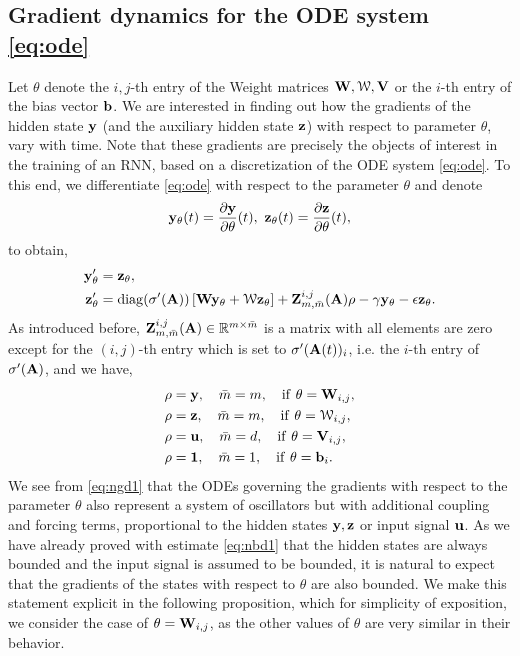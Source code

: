 \documentclass{article} \usepackage{iclr2021_conference,times}
\DeclareMathOperator{\diag}{diag}
\newcommand{\cW}{\EuScript{W}}
\newcommand{\by}{{\bf y}}
\newcommand{\bz}{{\bf z}}
\newcommand{\bW}{{\bf W}}
\newcommand{\bu}{{\bf u}}
\newcommand{\bb}{{\bf b}}
\newcommand{\bV}{{\bf V}}
\newcommand{\bA}{{\bf A}}
\begin{document}
\subsection{Gradient dynamics for the ODE system \eqref{eq:ode}}
\label{sec:gd}
Let $\theta$ denote the $i,j$-th entry of the Weight matrices $\bW,\cW,\bV$ or the $i$-th entry of the bias vector $\bb$. We are interested in finding out how the gradients of the hidden state $\by$ (and the auxiliary hidden state $\bz$) with respect to parameter $\theta$, vary with time. Note that these gradients are precisely the objects of interest in the training of an RNN, based on a discretization of the ODE system \eqref{eq:ode}. To this end, we differentiate \eqref{eq:ode} with respect to the parameter $\theta$ and denote 
$$
\by_{\theta}(t) = \frac{\partial \by}{\partial \theta}(t),~ \bz_{\theta}(t) = \frac{\partial \bz}{\partial \theta}(t),
$$
to obtain,
\begin{equation}
    \label{eq:ngd1}
    \begin{aligned}
    \by^{\prime}_{\theta} &= \bz_{\theta}, \\
    \bz^{\prime}_{\theta} &= \diag(\sigma^{\prime}(\bA))\left[\bW\by_{\theta} + \cW\bz_{\theta}\right] +  {\bf Z}_{m,\bar{m}}^{i,j}(\bA){\bf \rho} - \gamma \by_{\theta} -\epsilon \bz_{\theta}.
    \end{aligned}
\end{equation}
As introduced before, ${\bf Z}_{m,\bar{m}}^{i,j}(\bA) \in \mathbb{R}^{m \times \bar{m}}$ is a matrix with all elements are zero except for the $(i,j)$-th entry which is set to $\sigma^{\prime}(\bA(t))_i$, i.e. the $i$-th entry of $\sigma^{\prime}(\bA)$, and we have,
\begin{align*}
\rho &= \by, \quad \bar{m} =m, \quad {\rm if}~\theta = \bW_{i,j}, \\
\rho &= \bz, \quad \bar{m} =m, \quad {\rm if}~\theta = \cW_{i,j}, \\
\rho &= \bu, \quad \bar{m} =d, \quad {\rm if}~\theta = \bV_{i,j}, \\
\rho &= {\bf 1}, \quad \bar{m} =1, \quad {\rm if}~\theta = \bb_{i}.
\end{align*}
We see from \eqref{eq:ngd1} that the ODEs governing the gradients with respect to the parameter $\theta$ also represent a system of oscillators but with additional coupling and forcing terms, proportional to the hidden states $\by,\bz$ or input signal $\bu$. As we have already proved with estimate \eqref{eq:nbd1} that the hidden states are always bounded and the input signal is assumed to be bounded, it is natural to expect that the gradients of the states with respect to $\theta$ are also bounded. We make this statement explicit in the following proposition, which for simplicity of exposition, we consider the case of $\theta = \bW_{i,j}$, as the other values of $\theta$ are very similar in their behavior.
\end{document}
